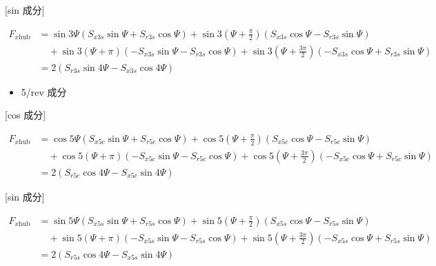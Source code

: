     [sin 成分]

    \begin{align}
    F_{x\mathrm{hub}}
    &= \sin 3\Psi
    \left(
    S_{x3s}\sin\Psi + S_{r3s}\cos\Psi
    \right)
    + \sin 3\left(\Psi + \frac{\pi}{2}\right)
    \left(
    S_{x3s}\cos\Psi - S_{r3s}\sin\Psi
    \right) \nonumber \\
    &\quad
    + \sin 3(\Psi + \pi)
    \left(
    - S_{x3s}\sin\Psi - S_{r3s}\cos\Psi
    \right)
    + \sin 3\left(\Psi + \frac{3\pi}{2}\right)
    \left(
    - S_{x3s}\cos\Psi + S_{r3s}\sin\Psi
    \right) \nonumber \\
    &= 2\left(
    S_{r3s}\sin 4\Psi - S_{x3s}\cos 4\Psi
    \right)
    \end{align}

    \begin{itemize}
    \item 5/rev 成分
    \end{itemize}

    [cos 成分]

    \begin{align}
    F_{x\mathrm{hub}}
    &= \cos 5\Psi
    \left(
    S_{x5c}\sin\Psi + S_{r5c}\cos\Psi
    \right)
    + \cos 5\left(\Psi + \frac{\pi}{2}\right)
    \left(
    S_{x5c}\cos\Psi - S_{r5c}\sin\Psi
    \right) \nonumber \\
    &\quad
    + \cos 5(\Psi + \pi)
    \left(
    - S_{x5c}\sin\Psi - S_{r5c}\cos\Psi
    \right)
    + \cos 5\left(\Psi + \frac{3\pi}{2}\right)
    \left(
    - S_{x5c}\cos\Psi + S_{r5c}\sin\Psi
    \right) \nonumber \\
    &= 2\left(
    S_{r5c}\cos 4\Psi - S_{x5c}\sin 4\Psi
    \right)
    \end{align}

    [sin 成分]

    \begin{align}
    F_{x\mathrm{hub}}
    &= \sin 5\Psi
    \left(
    S_{x5s}\sin\Psi + S_{r5s}\cos\Psi
    \right)
    + \sin 5\left(\Psi + \frac{\pi}{2}\right)
    \left(
    S_{x5s}\cos\Psi - S_{r5s}\sin\Psi
    \right) \nonumber \\
    &\quad
    + \sin 5(\Psi + \pi)
    \left(
    - S_{x5s}\sin\Psi - S_{r5s}\cos\Psi
    \right)
    + \sin 5\left(\Psi + \frac{3\pi}{2}\right)
    \left(
    - S_{x5s}\cos\Psi + S_{r5s}\sin\Psi
    \right) \nonumber \\
    &= 2\left(
    S_{r5s}\cos 4\Psi - S_{x5s}\sin 4\Psi
    \right)
    \end{align}

